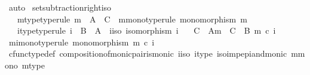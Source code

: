 \begin{isabellebody}
\ auto\isanewline
{}\isamarkupfalse%
%
\endisatagproof
{\isafoldproof}%
%
\isadelimproof
\isanewline
%
\endisadelimproof
\isanewline
{}\isamarkupfalse%
\ set{\isacharunderscore}{\kern0pt}subtraction{\isacharunderscore}{\kern0pt}right{\isacharunderscore}{\kern0pt}iso{\isacharcolon}{\kern0pt}\isanewline
\ \ \ m{\isacharunderscore}{\kern0pt}type{\isacharbrackleft}{\kern0pt}type{\isacharunderscore}{\kern0pt}rule{\isacharbrackright}{\kern0pt}{\isacharcolon}{\kern0pt}\ {\isachardoublequoteopen}m\ {\isacharcolon}{\kern0pt}\ A\ {\isasymrightarrow}\ C{\isachardoublequoteclose}\ \ m{\isacharunderscore}{\kern0pt}mono{\isacharbrackleft}{\kern0pt}type{\isacharunderscore}{\kern0pt}rule{\isacharbrackright}{\kern0pt}{\isacharcolon}{\kern0pt}\ {\isachardoublequoteopen}monomorphism\ m{\isachardoublequoteclose}\isanewline
\ \ \ i{\isacharunderscore}{\kern0pt}type{\isacharbrackleft}{\kern0pt}type{\isacharunderscore}{\kern0pt}rule{\isacharbrackright}{\kern0pt}{\isacharcolon}{\kern0pt}\ {\isachardoublequoteopen}i\ {\isacharcolon}{\kern0pt}\ B\ {\isasymrightarrow}\ A{\isachardoublequoteclose}\ \ i{\isacharunderscore}{\kern0pt}iso{\isacharcolon}{\kern0pt}\ {\isachardoublequoteopen}isomorphism\ i{\isachardoublequoteclose}\isanewline
\ \ \ {\isachardoublequoteopen}C\ {\isasymsetminus}\ {\isacharparenleft}{\kern0pt}A{\isacharcomma}{\kern0pt}m{\isacharparenright}{\kern0pt}\ {\isacharequal}{\kern0pt}\ C\ {\isasymsetminus}\ {\isacharparenleft}{\kern0pt}B{\isacharcomma}{\kern0pt}\ m\ {\isasymcirc}\isactrlsub c\ i{\isacharparenright}{\kern0pt}{\isachardoublequoteclose}\isanewline
%
\isadelimproof
%
\endisadelimproof
%
\isatagproof
{}\isamarkupfalse%
\ {\isacharminus}{\kern0pt}\isanewline
\ \ \isamarkupfalse%
\ mi{\isacharunderscore}{\kern0pt}mono{\isacharbrackleft}{\kern0pt}type{\isacharunderscore}{\kern0pt}rule{\isacharbrackright}{\kern0pt}{\isacharcolon}{\kern0pt}\ {\isachardoublequoteopen}monomorphism\ {\isacharparenleft}{\kern0pt}m\ {\isasymcirc}\isactrlsub c\ i{\isacharparenright}{\kern0pt}{\isachardoublequoteclose}\isanewline
\ \ \ \ \isamarkupfalse%
\ cfunc{\isacharunderscore}{\kern0pt}type{\isacharunderscore}{\kern0pt}def\ composition{\isacharunderscore}{\kern0pt}of{\isacharunderscore}{\kern0pt}monic{\isacharunderscore}{\kern0pt}pair{\isacharunderscore}{\kern0pt}is{\isacharunderscore}{\kern0pt}monic\ i{\isacharunderscore}{\kern0pt}iso\ i{\isacharunderscore}{\kern0pt}type\ iso{\isacharunderscore}{\kern0pt}imp{\isacharunderscore}{\kern0pt}epi{\isacharunderscore}{\kern0pt}and{\isacharunderscore}{\kern0pt}monic\ m{\isacharunderscore}{\kern0pt}mono\ m{\isacharunderscore}{\kern0pt}type\ \isamarkupfalse%

\end{isabellebody}
